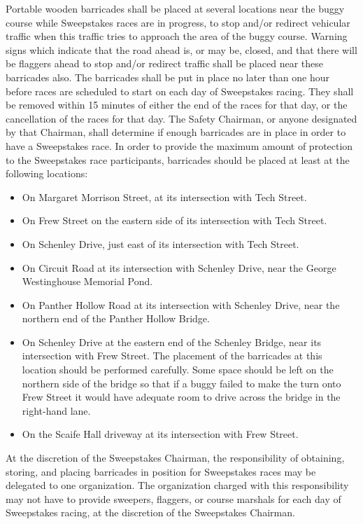 \documentclass[openany]{book}
\begin{document}
Portable wooden barricades shall be placed at several locations near the buggy course while Sweepstakes races are in progress, to stop and/or redirect vehicular traffic when this traffic tries to approach the area of the buggy course. Warning signs which indicate that the road ahead is, or may be, closed, and that there will be flaggers ahead to stop and/or redirect traffic shall be placed near these barricades also. The barricades shall be put in place no later than one hour before races are scheduled to start on each day of Sweepstakes racing. They shall be removed within 15 minutes of either the end of the races for that day, or the cancellation of the races for that day. The Safety Chairman, or anyone designated by that Chairman, shall determine if enough barricades are in place in order to have a Sweepstakes race. In order to provide the maximum amount of protection to the Sweepstakes race participants, barricades should be placed at least at the following locations:
\begin{itemize}
	\item On Margaret Morrison Street, at its intersection with Tech Street.
	\item On Frew Street on the eastern side of its intersection with Tech Street.
	\item On Schenley Drive, just east of its intersection with Tech Street.
	\item On Circuit Road at its intersection with Schenley Drive, near the George Westinghouse Memorial Pond.
	\item On Panther Hollow Road at its intersection with Schenley Drive, near the northern end of the Panther Hollow Bridge.
	\item On Schenley Drive at the eastern end of the Schenley Bridge, near its intersection with Frew Street. The placement of the barricades at this location should be performed carefully. Some space should be left on the northern side of the bridge so that if a buggy failed to make the turn onto Frew Street it would have adequate room to drive across the bridge in the right-hand lane.
	\item On the Scaife Hall driveway at its intersection with Frew Street.
\end{itemize}

At the discretion of the Sweepstakes Chairman, the responsibility of obtaining, storing, and placing barricades in position for Sweepstakes races may be delegated to one organization. The organization charged with this responsibility may not have to provide sweepers, flaggers, or course marshals for each day of Sweepstakes racing, at the discretion of the Sweepstakes Chairman.
\end{document}
